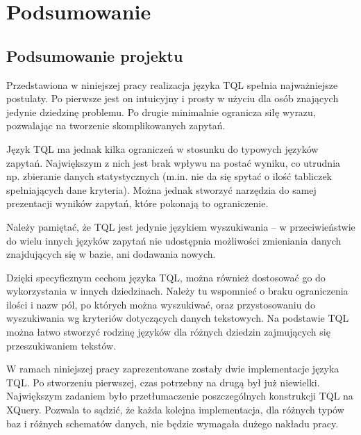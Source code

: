 \chapter*{Podsumowanie}
\section*{Podsumowanie projektu}
Przedstawiona w niniejszej pracy realizacja języka TQL spełnia najważniejsze postulaty. 
Po pierwsze jest on intuicyjny i prosty w użyciu dla osób znających jedynie dziedzinę problemu.
Po drugie minimalnie ogranicza siłę wyrazu, pozwalając na tworzenie skomplikowanych zapytań.

Język TQL ma jednak kilka ograniczeń w stosunku do typowych języków zapytań. 
Największym z nich jest brak wpływu na postać wyniku, co utrudnia np. zbieranie danych statystycznych 
(m.in. nie da się spytać o ilość tabliczek spełniających dane kryteria). 
Można jednak stworzyć narzędzia do samej prezentacji wyników zapytań, które pokonają to ograniczenie. 

Należy pamiętać, że TQL jest jedynie językiem wyszukiwania -- w przeciwieństwie do wielu innych języków zapytań
nie udostępnia możliwości zmieniania danych znajdujących się w bazie, ani dodawania nowych. 

Dzięki specyficznym cechom języka TQL, można również dostosować go do wykorzystania w innych dziedzinach. 
Należy tu wspomnieć o braku ograniczenia ilości i nazw pól, po których można wyszukiwać, oraz przystosowaniu 
do wyszukiwania wg kryteriów dotyczących danych tekstowych. 
Na podstawie TQL można łatwo stworzyć rodzinę języków dla różnych dziedzin zajmujących się przeszukiwaniem tekstów.

W ramach niniejszej pracy zaprezentowane zostały dwie implementacje języka TQL. 
Po stworzeniu pierwszej, czas potrzebny na drugą był już niewielki. 
Największym zadaniem było przetłumaczenie poszczególnych konstrukcji TQL na XQuery. 
Pozwala to sądzić, że każda kolejna implementacja, dla różnych typów baz i różnych schematów danych, 
nie będzie wymagała dużego nakładu pracy. 

\newpage 

